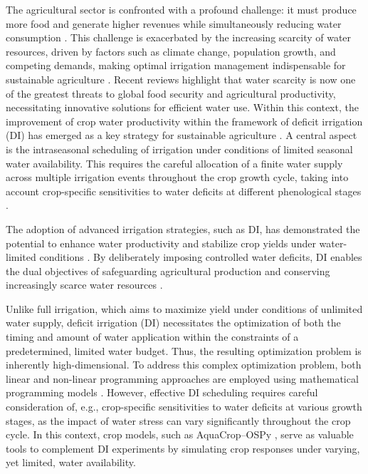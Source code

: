\documentclass{scrartcl}
\begin{document}
The agricultural sector is confronted with a profound challenge: it must produce more food and generate higher revenues while simultaneously reducing water consumption \citep{Doell2002,Rockstroem2010}. This challenge is exacerbated by the increasing scarcity of water resources, driven by factors such as climate change, population growth, and competing demands, making optimal irrigation management indispensable for sustainable agriculture \citep{Rosa2020}. Recent reviews highlight that water scarcity is now one of the greatest threats to global food security and agricultural productivity, necessitating innovative solutions for efficient water use.
Within this context, the improvement of crop water productivity within the framework of deficit irrigation (DI) has emerged as a key strategy for sustainable agriculture \citep{English1996}. A central aspect is the intraseasonal scheduling of irrigation under conditions of limited seasonal water availability. This requires the careful allocation of a finite water supply across multiple irrigation events throughout the crop growth cycle, taking into account crop-specific sensitivities to water deficits at different phenological stages \citep{Fereres2006,Vazifedoust2008}.

The adoption of advanced irrigation strategies, such as DI, has demonstrated the potential to enhance water productivity and stabilize crop yields under water-limited conditions \citep{English1996, Zhang1999}. By deliberately imposing controlled water deficits, DI enables the dual objectives of safeguarding agricultural production and conserving increasingly scarce water resources \citep{Schuetze2010}.

Unlike full irrigation, which aims to maximize yield under conditions of unlimited water supply, deficit irrigation (DI) necessitates the optimization of both the timing and amount of water application within the constraints of a predetermined, limited water budget. Thus, the resulting optimization problem is inherently high-dimensional. To address this complex optimization problem, both linear and non-linear programming approaches are employed using mathematical programming models \citep{Gorantiwar1995,Grove2018}. However, effective DI scheduling requires careful consideration of, e.g., crop-specific sensitivities to water deficits at various growth stages, as the impact of water stress can vary significantly throughout the crop cycle. In this context, crop models, such as AquaCrop–OSPy \citep{Kelly2021}, serve as valuable tools to complement DI experiments by simulating crop responses under varying, yet limited, water availability.
\end{document}
